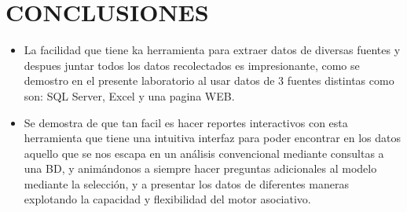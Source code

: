 \documentclass[12pt,letterpaper]{article}
\begin{document}
    \newpage
    \section{CONCLUSIONES}
    \begin{itemize}
        \item La facilidad que tiene ka herramienta para extraer datos de diversas fuentes y despues juntar todos los datos recolectados es impresionante, como se demostro en el presente laboratorio al usar datos de 3 fuentes distintas como son: SQL Server, Excel y una pagina WEB.
        \item Se demostra de que tan facil es hacer reportes interactivos con esta herramienta que tiene una intuitiva interfaz para poder encontrar en los datos aquello que se nos escapa en un análisis convencional mediante consultas a una BD, y animándonos a siempre hacer preguntas adicionales al modelo mediante la selección, y a presentar los datos de diferentes maneras explotando la capacidad y flexibilidad del motor asociativo.
    \end{itemize}
    \newpage
\end{document}
